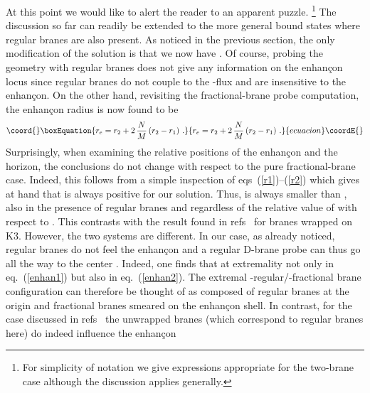\documentclass[a4paper,11pt]{article}
\providecommand{\eqref}[1]{(\ref{#1})}
\begin{document}
At this point we would like to alert the reader to an apparent puzzle.%
\footnote{For simplicity of notation we give expressions appropriate
for the two-brane case although the discussion applies generally.}
The discussion so far can readily be extended to the more general
bound states where \coordHE{} regular branes are also present. As noticed in
the previous section, the only modification of the solution is that we
now have \coordHE{}. Of course, probing the geometry with
regular branes does not give any information on the enhan\c{c}on locus
since regular branes do not couple to the \coordHE{}-flux and are
insensitive to the enhan\c{c}on. On the other hand, revisiting the
fractional-brane probe computation, the enhan\c{c}on radius is now
found to be
\begin{equation}\coord{}\boxEquation{
\label{enhan2}
r_e = r_2 + 2\,\frac{N}{M}\left(r_2-r_1\right) \,.
}{
r_e = r_2 + 2\,\frac{N}{M}\left(r_2-r_1\right) \,.
}{ecuacion}\coordE{}\end{equation}
Surprisingly, when examining the relative positions of the
enhan\c{c}on and the horizon, the conclusions do not change with
respect to the pure fractional-brane case. Indeed, this follows from
a simple inspection of eqs~\eqref{r1}--\eqref{r2} which gives at hand
that \coordHE{} is always positive for our solution. Thus, \coordHE{} is
always smaller than \coordHE{}, also in the presence of  regular branes
and regardless of the relative value of \coordHE{} with respect to \coordHE{}.
This contrasts with the result found in
refs~\cite{Johnson:1999qt,Johnson:2001wm} for branes wrapped on K3.
However, the two systems are different. In our case, as already noticed,
regular branes do not feel the enhan\c{c}on and a regular D-brane
probe can thus go all the way to the center \coordHE{}. Indeed, one finds
that \coordHE{} at extremality not only in eq.~\eqref{enhan1} but
also in eq.~\eqref{enhan2}. The extremal \coordHE{}-regular/\coordHE{}-fractional
brane configuration can therefore be thought of as composed of \coordHE{}
regular branes at the origin and \coordHE{} fractional branes smeared on the
enhan\c{c}on shell. In contrast, for the case discussed in
refs~\cite{Johnson:1999qt,Johnson:2001wm} the unwrapped branes (which
correspond to regular branes here) do indeed influence the enhan\c{c}on
\end{document}
